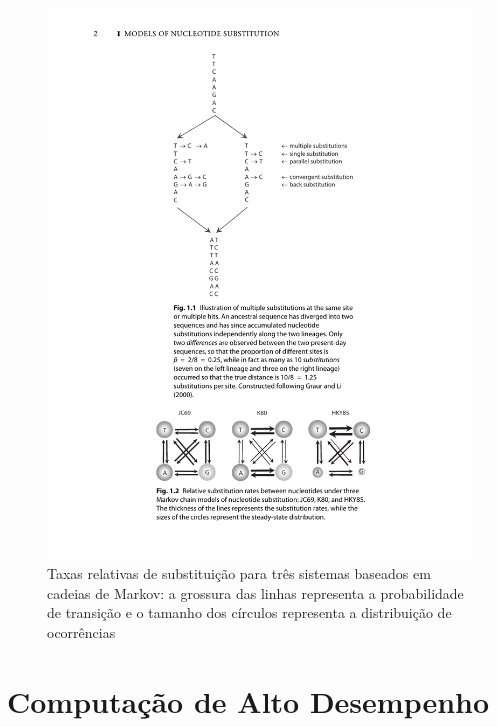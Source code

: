 \documentclass[english,brazilian]{UNISINOSmonografia} %
\newcommand\defaultFigureWidth{0.9}
\begin{document}
\begin{figure}[tb]
	\centering%
	\begin{minipage}{\defaultFigureWidth\textwidth}
		\caption[Taxas relativas de substituição para três sistemas baseados em cadeias de Markov]{Taxas relativas de substituição para três sistemas baseados em cadeias de Markov: a grossura das linhas representa a probabilidade de transição e o tamanho dos círculos representa a distribuição de ocorrências}
		\label{fig:models}
		\includegraphics[trim=130 95 120 500,clip,width=\textwidth]{yang2014molecular-fig1-2}
	\end{minipage}
\end{figure}




\section{Computação de Alto Desempenho}
\label{sec:computacao}
\end{document}
